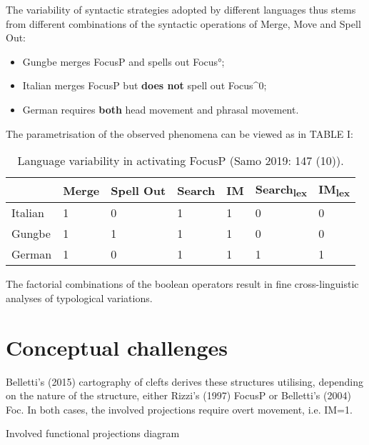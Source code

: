 \documentclass[fleqn,10pt]{wlscirep}
\begin{document}
\noindent The variability of syntactic strategies adopted by different languages thus stems from different combinations of the syntactic operations of Merge, Move and Spell Out: 

\begin{itemize}
\item Gungbe merges FocusP and spells out Focus°; 
\item \vspace*{-2mm} Italian merges FocusP but \textbf{does not} spell out Focus^0; 
\item \vspace*{-2mm} German requires \textbf{both} head movement and phrasal movement. 
\end{itemize}

\noindent The parametrisation of the observed phenomena can be viewed as in TABLE I:

\begin{table}[H]
    \centering
    \begin{tabular}{|l|l|l|l|l|l|l|}
    \hline
     & Merge & Spell Out & Search & IM & Search\textsubscript{lex} & IM\textsubscript{lex} \\
    \hline
    Italian & 1 & 0 & 1 & 1 & 0 & 0 \\
    \hline
    Gungbe & 1 & 1 & 1 & 1 & 0 & 0 \\
    \hline
    German & 1 & 0 & 1 & 1 & 1 & 1 \\
    \hline
    \end{tabular}
    \caption{\label{tab:samp}Language variability in activating FocusP (Samo 2019: 147 (10)).}
    \end{table}

\noindent The factorial combinations of the boolean operators result in fine cross-linguistic analyses of typological variations.


\section*{Conceptual challenges}

Belletti’s (2015) cartography of clefts derives these structures utilising, depending on the nature of the structure, either Rizzi’s (1997) FocusP or Belletti’s (2004) Foc. 
In both cases, the involved projections require overt movement, i.e. IM=1.

\begin{exe}
    \ex Involved functional projections diagram
\end{exe}
\end{document}
